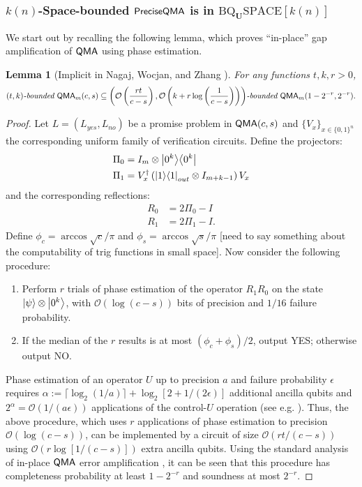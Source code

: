 \documentclass[11pt]{article}
\newtheorem{lemma}{Lemma}
\theoremstyle{definition}
\theoremstyle{remark}
\newcommand\QMA{{\sf{QMA}}}
\newcommand\QMAexp{\sf{PreciseQMA}}
\newcommand\bddQMA[5]{{\left(#1,#2\right)}\textit{-bounded }\QMA_{#3}(#4,#5)}
\newcommand{\classfont}{\mathrm}
\newcommand{\Unitary}{\mathbf{U}}
\newcommand{\unitaryBQSPACE}[1]{\classfont{BQ}_\Unitary\classfont{SPACE}[#1]}
\begin{document}
\subsubsection{$k(n)$-Space-bounded $\QMAexp$ is in $\unitaryBQSPACE{k(n)}$} \label{subsec:bddqma-in-bqspace}
We start out by recalling the following lemma, which proves ``in-place'' gap amplification of $\QMA$ using phase estimation.
\begin{lemma}[Implicit in Nagaj, Wocjan, and Zhang \cite{nwz11}] \label{lem: gap amp 1}
For any functions $t,k,r>0$, 
\[
\bddQMA{t}{k}{m}{c}{s}\subseteq\bddQMA{\mathcal{O}\left(\frac{rt}{c-s}\right)}{\mathcal{O}\left(k+r\log\left(\frac{1}{c-s}\right)\right)}{m}{1-2^{-r}}{2^{-r}}.
\]
\end{lemma}
\begin{proof}
	Let $L=(L_{yes}, L_{no})$ be a promise problem in $\QMA(c,s)$ and $\{V_x\}_{x\in\{0,1\}^n}$ the corresponding uniform family of verification circuits.
Define the projectors:
\begin{align}
\Pi_0 &= I_m \otimes {\left\vert{0^k}\right\rangle}{\left\langle{0^k}\right\vert} \\
\Pi_1 &= V^\dagger_x \left({\left\vert{1}\right\rangle}{\left\langle{1}\right\vert}_{out} \otimes I_{m+k-1}\right) V_x
\end{align}
and the corresponding reflections:
\begin{align}
R_0 &= 2\Pi_0 - I \\
R_1 &= 2\Pi_1 - I.
\end{align}
Define $\phi_c = \arccos\sqrt{c}/\pi$ and $\phi_s = \arccos\sqrt{s}/\pi$ [need to say something about the computability of trig functions in small space]. 
Now consider the following procedure:
\begin{enumerate}
\item Perform $r$ trials of phase estimation of the operator $R_1R_0$ on the state ${\left\vert{\psi}\right\rangle}\otimes {\left\vert{0^k}\right\rangle}$, with $\mathcal{O}(\log(c-s))$ bits of precision and $1/16$ failure probability. 
\item If the median of the $r$ results is at most $(\phi_{c}+\phi_{s})/2$, output YES; otherwise output NO.
\end{enumerate}
Phase estimation of an operator $U$ up to precision $a$ and failure probability $\epsilon$ requires $\alpha := \lceil\log_2(1/a)\rceil + \log_2[2+1/(2\epsilon)]$ additional ancilla qubits and $2^\alpha = \mathcal{O}(1/(a\epsilon))$ applications of the control-$U$ operation (see e.g. \cite{nc00}).  Thus, the above procedure, which uses $r$ applications of phase estimation to precision $\mathcal{O}(\log(c-s))$, can be implemented by a circuit of size $\mathcal{O}(rt/(c-s))$ using $\mathcal{O}(r\log[1/(c-s)])$ extra ancilla qubits. Using the standard analysis of in-place $\QMA$ error amplification \cite{mw05,nwz11}, it can be seen that this procedure has completeness probability at least $1-2^{-r}$ and soundness at most $2^{-r}$.
\end{proof}
\end{document}
